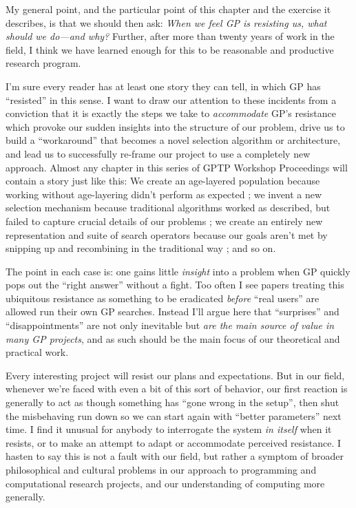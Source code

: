 My general point, and the particular point of this chapter and the exercise it describes, is that we should then ask: \emph{When we feel GP is resisting us, what should we do---and why?} Further, after more than twenty years of work in the field, I think we have learned enough for this to be reasonable and productive research program.

I'm sure every reader has at least one story they can tell, in which GP has ``resisted'' in this sense. I want to draw our attention to these incidents from a conviction that it is exactly the steps we take to \emph{accommodate} GP's resistance which provoke our sudden insights into the structure of our problem, drive us to build a ``workaround'' that becomes a novel selection algorithm or architecture, and lead us to successfully re-frame our project to use a completely new approach. Almost any chapter in this series of GPTP Workshop Proceedings will contain a story just like this: We create an age-layered population because working without age-layering didn't perform as expected \citep{Hornby:2009:GPTP}; we invent a new selection mechanism because traditional algorithms worked as described, but failed to capture crucial details of our problems \citep{Spector:2012:GECCOcompA}; we create an entirely new representation and suite of search operators because our goals aren't met by snipping up and recombining in the traditional way \citep{ryan:2003:GPTP}; and so on.

The point in each case is: one gains little \emph{insight} into a problem when GP quickly pops out the ``right answer'' without a fight. Too often I see papers treating this ubiquitous resistance as something to be eradicated \emph{before} ``real users'' are allowed run their own GP searches. Instead I'll argue here that ``surprises'' and ``disappointments'' are not only inevitable but \emph{are the main source of value in many GP projects}, and as such should be the main focus of our theoretical and practical work.

Every interesting project will resist our plans and expectations. But in our field, whenever we're faced with even a bit of this sort of behavior, our first reaction is generally to act as though something has ``gone wrong in the setup'', then shut the misbehaving run down so we can start again with ``better parameters'' next time. I find it unusual for anybody to interrogate the system \emph{in itself} when it resists, or to make an attempt to adapt or accommodate perceived resistance. I hasten to say this is not a fault with our field, but rather a symptom of broader philosophical and cultural problems in our approach to programming and computational research projects, and our understanding of computing more generally.

